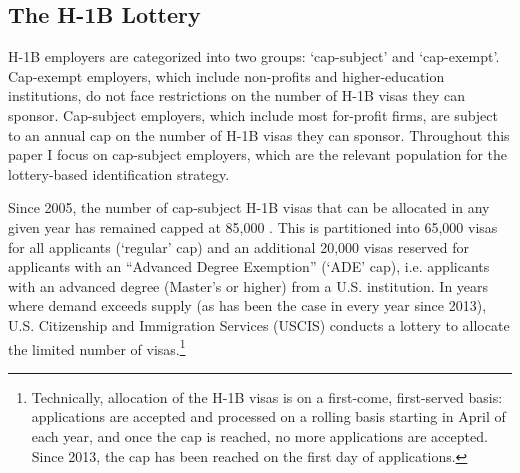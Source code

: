 
\subsection{The H-1B Lottery}
H-1B employers are categorized into two groups: `cap-subject' and `cap-exempt'. Cap-exempt employers, which include non-profits and higher-education institutions, do not face restrictions on the number of H-1B visas they can sponsor. Cap-subject employers, which include most for-profit firms, are subject to an annual cap on the number of H-1B visas they can sponsor. Throughout this paper I focus on cap-subject employers, which are the relevant population for the lottery-based identification strategy.

Since 2005, the number of cap-subject H-1B visas that can be allocated in any given year has remained capped at 85,000 \citep{uscis_h1b_overview_2021}. This is partitioned into 65,000 visas for all applicants (`regular' cap) and an additional 20,000 visas reserved for applicants with an ``Advanced Degree Exemption'' (`ADE' cap), i.e. applicants with an advanced degree (Master's or higher) from a U.S. institution. In years where demand exceeds supply (as has been the case in every year since 2013), U.S. Citizenship and Immigration Services (USCIS) conducts a lottery to allocate the limited number of visas.\footnote{Technically, allocation of the H-1B visas is on a first-come, first-served basis: applications are accepted and processed on a rolling basis starting in April of each year, and once the cap is reached, no more applications are accepted. Since 2013, the cap has been reached on the first day of applications.}


